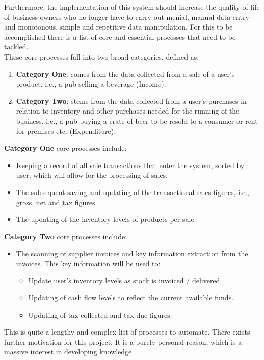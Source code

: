 Furthermore, the implementation of this system should increase the quality of life of business owners who no longer have to carry out menial, manual data entry and monotonous, simple and
repetitive data manipulation.
\bigbreak
For this to be accomplished there is a list of
core and essential processes that need to be tackled. \\
These core processes fall into two broad categories, defined as:
\begin{enumerate}
	\item \textbf{Category One}: comes from the data collected from a sale of a user's product, i.e., a pub selling a beverage (Income).
	\item \textbf{Category Two}: stems from the data collected from a user's purchases in relation to inventory and other purchases needed for the running of the
	      business, i.e., a pub buying a crate of beer to be resold to a consumer or rent for premises etc. (Expenditure).
\end{enumerate}
\textbf{Category One} core processes include:
\begin{itemize}
	\item Keeping a record of all sale transactions that enter the system, sorted by user, which will allow for the processing of sales.
	\item The subsequent saving and updating of the transactional sales figures, i.e., gross, net and tax figures.
	\item The updating of the inventory levels of products per sale.
\end{itemize}
\textbf{Category Two} core processes include:
\begin{itemize}
	\item The scanning of supplier invoices and key information extraction from the invoices. This key information will be used to:
	      \begin{itemize}
		      \item Update user's inventory levels as stock is invoiced / delivered.
		      \item Updating of cash flow levels to reflect the current available funds.
		      \item Updating of tax collected and tax due figures.
	      \end{itemize}
\end{itemize}
This is quite a lengthy and complex list of processes to automate.
\bigbreak
There exists further motivation for this project. It is a purely personal reason, which is a massive interest in developing knowledge 
